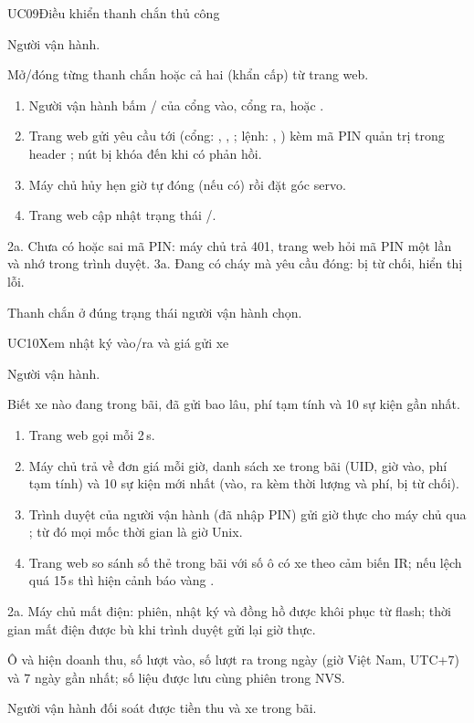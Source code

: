 \begin{usecase}{UC09}{Điều khiển thanh chắn thủ công}
\item[Tác nhân] Người vận hành.
\item[Mô tả] Mở/đóng từng thanh chắn hoặc cả hai (khẩn cấp) từ trang web.
\item[Luồng chính] \begin{enumerate}[nosep,leftmargin=1.3em]
  \item Người vận hành bấm / của cổng vào, cổng ra, hoặc
        .
  \item Trang web gửi yêu cầu  tới  (cổng: , , ; lệnh: , ) kèm mã PIN quản trị trong header ; nút bị khóa đến khi có phản hồi.
  \item Máy chủ hủy hẹn giờ tự đóng (nếu có) rồi đặt góc servo.
  \item Trang web cập nhật trạng thái /.
\end{enumerate}
\item[Ngoại lệ] 2a. Chưa có hoặc sai mã PIN: máy chủ trả 401, trang web hỏi mã PIN một lần
      và nhớ trong trình duyệt. 3a. Đang có cháy mà yêu cầu đóng: bị từ chối, hiển thị lỗi.
\item[Hậu điều kiện] Thanh chắn ở đúng trạng thái người vận hành chọn.
\end{usecase}

\begin{usecase}{UC10}{Xem nhật ký vào/ra và giá gửi xe}
\item[Tác nhân] Người vận hành.
\item[Mô tả] Biết xe nào đang trong bãi, đã gửi bao lâu, phí tạm tính và 10 sự kiện gần nhất.
\item[Luồng chính] \begin{enumerate}[nosep,leftmargin=1.3em]
  \item Trang web gọi  mỗi 2\,s.
  \item Máy chủ trả về đơn giá mỗi giờ, danh sách xe trong bãi (UID, giờ vào, phí tạm tính) và
        10 sự kiện mới nhất (vào, ra kèm thời lượng và phí, bị từ chối).
  \item Trình duyệt của người vận hành (đã nhập PIN) gửi giờ thực cho máy chủ qua
        ; từ đó mọi mốc thời gian là giờ Unix.
  \item Trang web so sánh số thẻ trong bãi với số ô có xe theo cảm biến IR; nếu lệch quá 15\,s thì
        hiện cảnh báo vàng .
\end{enumerate}
\item[Ngoại lệ] 2a. Máy chủ mất điện: phiên, nhật ký và đồng hồ được khôi phục từ flash;
  thời gian mất điện được bù khi trình duyệt gửi lại giờ thực.
\item[Luồng phụ] Ô  và  hiện doanh thu, số lượt vào, số lượt ra
  trong ngày (giờ Việt Nam, UTC+7) và 7 ngày gần nhất; số liệu được lưu cùng phiên trong NVS.
\item[Hậu điều kiện] Người vận hành đối soát được tiền thu và xe trong bãi.
\end{usecase}
